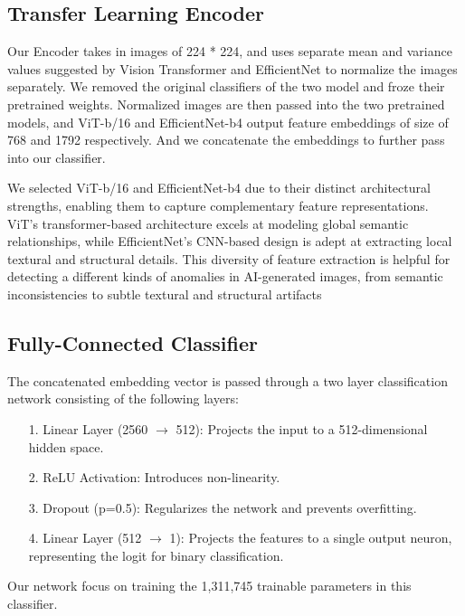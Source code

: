 \documentclass{article} %
\begin{document}
\subsection{Transfer Learning Encoder}

Our Encoder takes in images of 224 * 224, and uses separate mean and variance values suggested by Vision Transformer and EfficientNet to normalize the images separately.  We removed the original classifiers of the two model and froze their pretrained weights. Normalized images are then passed into the two pretrained models, and ViT-b/16 and EfficientNet-b4 output feature embeddings of size of 768 and 1792 respectively. And we concatenate the embeddings to further pass into our classifier.

We selected ViT-b/16 and EfficientNet-b4 due to their distinct architectural strengths, enabling them to capture complementary feature representations. ViT's transformer-based architecture excels at modeling global semantic relationships, while EfficientNet's CNN-based design is adept at extracting local textural and structural details. This diversity of feature extraction is helpful for detecting a different kinds of anomalies in AI-generated images, from semantic inconsistencies to subtle textural and structural artifacts

\subsection{Fully-Connected Classifier}

The concatenated embedding vector is passed through a two layer classification network consisting of the following layers:
\begin{enumerate}
    \item[1.]Linear Layer (2560 $\rightarrow$ 512): Projects the input to a 512-dimensional hidden space.
    \item[2.]ReLU Activation: Introduces non-linearity.
    \item[3.]Dropout (p=0.5): Regularizes the network and prevents overfitting.
    \item[4.]Linear Layer (512 $\rightarrow$ 1): Projects the features to a single output neuron, representing the logit for binary classification.
\end{enumerate}
Our network focus on training the 1,311,745 trainable parameters in this classifier.
\end{document}
